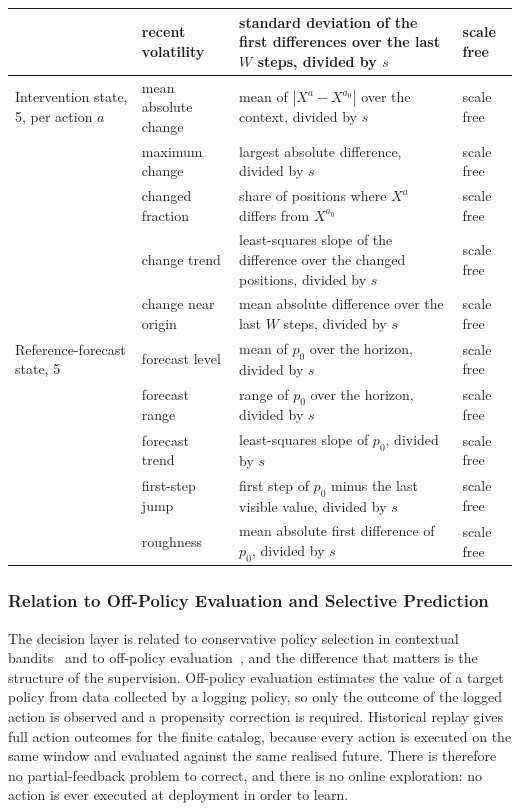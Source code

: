 \documentclass{article}
\begin{document}
\begin{table}[h]
{\begin{tabular}{@{}l p{} p{} p{}@{}}
     & recent volatility & standard deviation of the first differences over the last $W$ steps, divided by $s$ & scale free \\
    \midrule
    Intervention state, 5, per action $a$ & mean absolute change & mean of $|X^{a} - X^{a_0}|$ over the context, divided by $s$ & scale free \\
     & maximum change & largest absolute difference, divided by $s$ & scale free \\
     & changed fraction & share of positions where $X^{a}$ differs from $X^{a_0}$ & scale free \\
     & change trend & least-squares slope of the difference over the changed positions, divided by $s$ & scale free \\
     & change near origin & mean absolute difference over the last $W$ steps, divided by $s$ & scale free \\
    \midrule
    Reference-forecast state, 5 & forecast level & mean of $p_0$ over the horizon, divided by $s$ & scale free \\
     & forecast range & range of $p_0$ over the horizon, divided by $s$ & scale free \\
     & forecast trend & least-squares slope of $p_0$, divided by $s$ & scale free \\
     & first-step jump & first step of $p_0$ minus the last visible value, divided by $s$ & scale free \\
     & roughness & mean absolute first difference of $p_0$, divided by $s$ & scale free \\
    \bottomrule
  \end{tabular}}
\end{table}

\subsubsection{Relation to Off-Policy Evaluation and Selective Prediction}
\label{app:ope-positioning}
The decision layer is related to conservative policy selection in contextual
bandits~\citep{abbasiyadkori2011improved,lattimore2020bandit} and to off-policy
evaluation~\citep{strehl2010learning,dudik2011doubly,swaminathan2015counterfactual,
jiang2016doubly,thomas2016data}, and the difference that matters is the structure of the
supervision. Off-policy evaluation estimates the value of a target policy from data collected
by a logging policy, so only the outcome of the logged action is observed and a propensity
correction is required. Historical replay gives full action outcomes for the finite catalog,
because every action is executed on the same window and evaluated against the same realised
future. There is therefore no partial-feedback problem to correct, and there is no online
exploration: no action is ever executed at deployment in order to learn.
\end{document}
